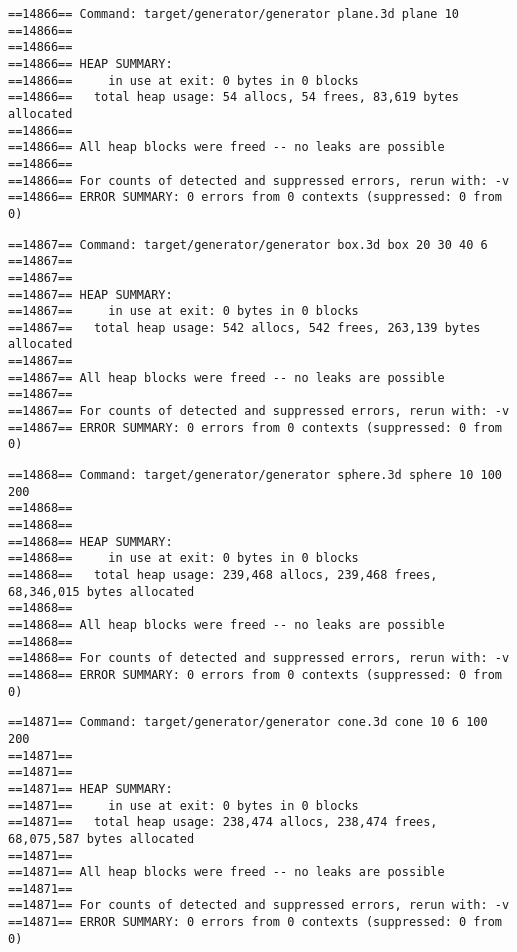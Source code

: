 
\begin{verbatim}
==14866== Command: target/generator/generator plane.3d plane 10
==14866==
==14866==
==14866== HEAP SUMMARY:
==14866==     in use at exit: 0 bytes in 0 blocks
==14866==   total heap usage: 54 allocs, 54 frees, 83,619 bytes allocated
==14866==
==14866== All heap blocks were freed -- no leaks are possible
==14866==
==14866== For counts of detected and suppressed errors, rerun with: -v
==14866== ERROR SUMMARY: 0 errors from 0 contexts (suppressed: 0 from 0)
\end{verbatim}

\begin{verbatim}
==14867== Command: target/generator/generator box.3d box 20 30 40 6
==14867==
==14867==
==14867== HEAP SUMMARY:
==14867==     in use at exit: 0 bytes in 0 blocks
==14867==   total heap usage: 542 allocs, 542 frees, 263,139 bytes allocated
==14867==
==14867== All heap blocks were freed -- no leaks are possible
==14867==
==14867== For counts of detected and suppressed errors, rerun with: -v
==14867== ERROR SUMMARY: 0 errors from 0 contexts (suppressed: 0 from 0)
\end{verbatim}

\begin{verbatim}
==14868== Command: target/generator/generator sphere.3d sphere 10 100 200
==14868==
==14868==
==14868== HEAP SUMMARY:
==14868==     in use at exit: 0 bytes in 0 blocks
==14868==   total heap usage: 239,468 allocs, 239,468 frees, 68,346,015 bytes allocated
==14868==
==14868== All heap blocks were freed -- no leaks are possible
==14868==
==14868== For counts of detected and suppressed errors, rerun with: -v
==14868== ERROR SUMMARY: 0 errors from 0 contexts (suppressed: 0 from 0)
\end{verbatim}

\begin{verbatim}
==14871== Command: target/generator/generator cone.3d cone 10 6 100 200
==14871==
==14871==
==14871== HEAP SUMMARY:
==14871==     in use at exit: 0 bytes in 0 blocks
==14871==   total heap usage: 238,474 allocs, 238,474 frees, 68,075,587 bytes allocated
==14871==
==14871== All heap blocks were freed -- no leaks are possible
==14871==
==14871== For counts of detected and suppressed errors, rerun with: -v
==14871== ERROR SUMMARY: 0 errors from 0 contexts (suppressed: 0 from 0)
\end{verbatim}
